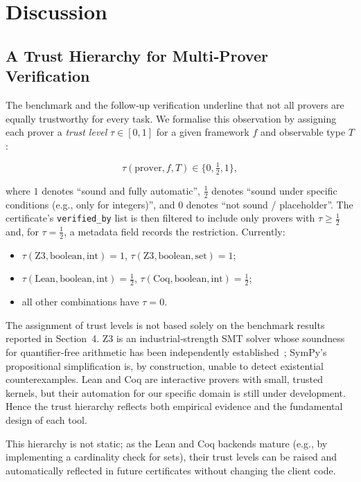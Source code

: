 \newpage
\section{Discussion}

\subsection{A Trust Hierarchy for Multi‑Prover Verification}

The benchmark and the follow‑up verification underline that not all provers
are equally trustworthy for every task.  We formalise this observation by
assigning each prover a \emph{trust level} $\tau \in [0,1]$ for a given
framework $f$ and observable type $T$:

\[
\tau(\text{prover}, f, T) \in \{0, \tfrac{1}{2}, 1\},
\]

where $1$ denotes ``sound and fully automatic'', $\tfrac{1}{2}$ denotes
``sound under specific conditions (e.g., only for integers)'', and $0$
denotes ``not sound / placeholder''.  The certificate's \texttt{verified\_by}
list is then filtered to include only provers with $\tau \ge \tfrac{1}{2}$
and, for $\tau = \tfrac{1}{2}$, a metadata field records the restriction.
Currently:

\begin{itemize}
    \item $\tau(\text{Z3}, \text{boolean}, \text{int}) = 1$,
          $\tau(\text{Z3}, \text{boolean}, \text{set}) = 1$;
    \item $\tau(\text{Lean}, \text{boolean}, \text{int}) = \tfrac{1}{2}$,
          $\tau(\text{Coq}, \text{boolean}, \text{int}) = \tfrac{1}{2}$;
    \item all other combinations have $\tau = 0$.
\end{itemize}

The assignment of trust levels is not based solely on the benchmark
results reported in Section~4.  Z3 is an industrial‑strength SMT
solver whose soundness for quantifier‑free arithmetic has been
independently established~\cite{moura2008z3}; SymPy's propositional
simplification is, by construction, unable to detect existential
counterexamples.  Lean and Coq are interactive provers with small,
trusted kernels, but their automation for our specific domain is
still under development.  Hence the trust hierarchy reflects both
empirical evidence and the fundamental design of each tool.

This hierarchy is not static; as the Lean and Coq backends mature (e.g., by
implementing a cardinality check for sets), their trust levels can be raised
and automatically reflected in future certificates without changing the
client code.

